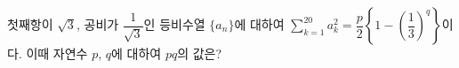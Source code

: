 첫째항이 $\sqrt{3}$, 공비가 $\dfrac{1}{\sqrt{3}}$인 등비수열 $\{a_n\}$에 대하여 $\displaystyle\sum_{k=1}^{20} a_k^2=\dfrac{p}{2}\left\{1-\left(\dfrac{1}{3}\right)^{q}\right\}$이다. 이때 자연수 $p$, $q$에 대하여 $pq$의 값은?
